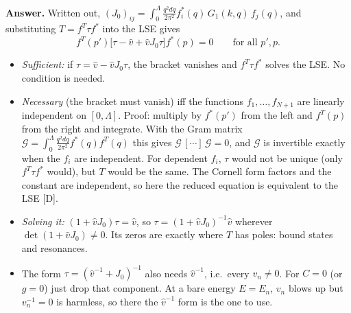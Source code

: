 \documentclass[11pt]{article}
\newcommand{\tagD}{\textcolor{orange!85!black}{\textsf{\small[D]}}}
\newenvironment{aiadd}{\par}{\par}
\begin{document}
\begin{aiadd}
	\textbf{Answer.} Written out, $(J_0)_{ij}=\int_0^\Lambda\frac{q^2dq}{2\pi^2}f_i^*(q)\,G_1(k,q)\,f_j(q)$, and substituting $T=f^T\tau f^*$ into the LSE gives
	\[
		f^T(p')\big[\tau-\hat v+\hat vJ_0\tau\big]f^*(p)=0\qquad\text{for all }p',p .
	\]
	\begin{itemize}
		\item \emph{Sufficient:} if $\tau=\hat v-\hat vJ_0\tau$, the bracket vanishes and $f^T\tau f^*$ solves the LSE. No condition is needed.
		\item \emph{Necessary} (the bracket must vanish) iff the functions $f_1,\dots,f_{N+1}$ are linearly independent on $[0,\Lambda]$. Proof: multiply by $f^*(p')$ from the left and $f^T(p)$ from the right and integrate. With the Gram matrix $\mathcal G=\int_0^\Lambda\frac{q^2dq}{2\pi^2}f^*(q)f^T(q)$ this gives $\mathcal G\,[\cdots]\,\mathcal G=0$, and $\mathcal G$ is invertible exactly when the $f_i$ are independent. For dependent $f_i$, $\tau$ would not be unique (only $f^T\tau f^*$ would), but $T$ would be the same. The Cornell form factors and the constant are independent, so here the reduced equation is equivalent to the LSE \tagD.
		\item \emph{Solving it:} $(1+\hat vJ_0)\tau=\hat v$, so $\tau=(1+\hat vJ_0)^{-1}\hat v$ wherever $\det(1+\hat vJ_0)\neq0$. Its zeros are exactly where $T$ has poles: bound states and resonances.
		\item The form $\tau=(\hat v^{-1}+J_0)^{-1}$ also needs $\hat v^{-1}$, i.e.\ every $v_n\neq0$. For $C=0$ (or $g=0$) just drop that component. At a bare energy $E=E_n$, $v_n$ blows up but $v_n^{-1}=0$ is harmless, so there the $\hat v^{-1}$ form is the one to use.
	\end{itemize}
\end{aiadd}
\end{document}
